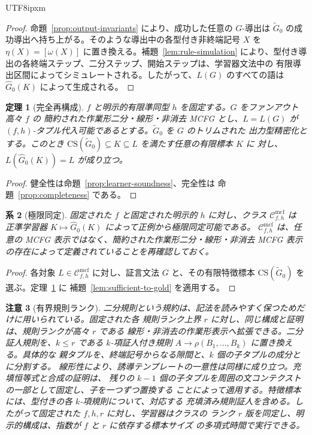 \documentclass[10pt,a4paper]{article}
\newtheorem{theorem}{定理}[section]
\newtheorem{corollary}[theorem]{系}
\newtheorem{remark}[theorem]{注意}
\theoremstyle{remark}
\newcommand{\CS}{\mathrm{CS}}
\newcommand{\Cmcf}[2]{\mathcal{C}^{\mathrm{mcf}}_{#1,#2}}
\begin{document}
\begin{CJK}{UTF8}{ipxm}
\begin{proof}
命題~\ref{prop:output-invariants} により、成功した任意の \(G\)-導出は
\(\widetilde G_0\) の成功導出へ持ち上がる。そのような導出中の各型付き非終端記号
\(X\) を \(\eta(X)=[\omega(X)]\) に置き換える。補題~\ref{lem:rule-simulation}
により、型付き導出の各終端ステップ、二分ステップ、開始ステップは、学習器文法中の
有限導出区間によってシミュレートされる。したがって、\(L(G)\) のすべての語は
\(\widehat G_0(K)\) によって生成される。
\end{proof}

\begin{theorem}[完全再構成]
\label{thm:exact-reconstruction}
\(f\) と明示的有限準同型 \(h\) を固定する。\(G\) をファンアウト高々 \(f\) の
簡約された作業形二分・線形・非消去 MCFG とし、\(L=L(G)\) が
\((f,h)\)-タプル代入可能であるとする。\(\widetilde G_0\) を \(G\) のトリムされた
出力型精密化とする。このとき
\(\CS(\widetilde G_0)\subseteq K\subseteq L\) を満たす任意の有限標本 \(K\) に
対し、\(L(\widehat G_0(K))=L\) が成り立つ。
\end{theorem}

\begin{proof}
健全性は命題~\ref{prop:learner-soundness}、完全性は
命題~\ref{prop:completeness} である。
\end{proof}

\begin{corollary}[極限同定]
\label{cor:gold}
固定された \(f\) と固定された明示的 \(h\) に対し、クラス \(\Cmcf{f}{h}\) は
正準学習器 \(K\mapsto\widehat G_0(K)\) によって正例から極限同定可能である。
\(\Cmcf{f}{h}\) は、任意の MCFG 表示ではなく、簡約された作業形二分・線形・非消去
MCFG 表示の存在によって定義されていることを再確認しておく。
\end{corollary}

\begin{proof}
各対象 \(L\in\Cmcf{f}{h}\) に対し、証言文法 \(G\) と、その有限特徴標本
\(\CS(\widetilde G_0)\) を選ぶ。定理~\ref{thm:exact-reconstruction} に
補題~\ref{lem:sufficient-to-gold} を適用する。
\end{proof}

\begin{remark}[有界規則ランク]
\label{rem:bounded-rule-rank}
二分規則という規約は、記法を読みやすく保つためだけに用いられている。固定された各
規則ランク上界 \(r\) に対し、同じ構成と証明は、規則ランクが高々 \(r\) である
線形・非消去の作業形表示へ拡張できる。二分証人規則を、\(k\le r\) である
\(k\)-項証人付き規則 \(A\to\rho(B_1,\ldots,B_k)\) に置き換える。具体的な
親タプルを、終端記号からなる隙間と、\(k\) 個の子タプルの成分とに分割する。
線形性により、誘導テンプレートの一意性は同様に成り立つ。充填恒等式と合成の証明は、
残りの \(k-1\) 個の子タプルを周囲の文コンテクストの一部として固定し、子を一つずつ置換する
ことによって適用する。特徴標本には、型付きの各 \(k\)-項規則について、対応する
充填済み規則証人を含める。したがって固定された \(f,h,r\) に対し、学習器はクラスの
ランク \(r\) 版を同定し、明示的構成は、指数が \(f\) と \(r\) に依存する標本サイズ
の多項式時間で実行できる。
\end{remark}



\end{CJK}
\end{document}
